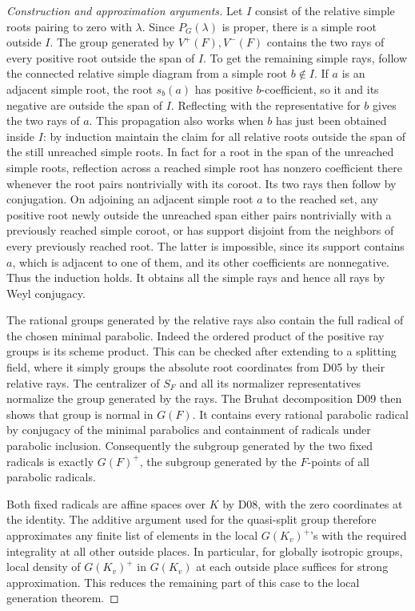 \documentclass[11pt,a4paper,openany,oneside]{book}
\theoremstyle{resultstyle}
\theoremstyle{definition}
\numberwithin{equation}{chapter}
\begin{document}
\begin{proof}[Construction and approximation arguments]
Let \(I\) consist of the relative simple roots pairing
to zero with \(\lambda\). Since \(P_G(\lambda)\) is
proper, there is a simple root outside \(I\).
The group generated by \(V^+(F),V^-(F)\) contains the
two rays of every positive root outside the span of
\(I\). To get the remaining simple rays, follow the
connected relative simple diagram from a simple root
\(b\notin I\). If \(a\) is an adjacent simple root, the
root \(s_b(a)\) has positive \(b\)-coefficient, so it and
its negative are outside the span of \(I\). Reflecting
with the representative for \(b\) gives the two rays of
\(a\). This propagation also works when \(b\) has just
been obtained inside \(I\): by induction maintain the
claim for all relative roots outside the span of the
still unreached simple roots. In fact for a root in the
span of the unreached simple roots, reflection across
a reached simple root has nonzero coefficient there
whenever the root pairs nontrivially with its coroot.
Its two rays then follow by conjugation. On adjoining
an adjacent simple root \(a\) to the reached set, any
positive root newly outside the unreached span either
pairs nontrivially with a previously reached simple
coroot, or has support disjoint from the neighbors of
every previously reached root. The latter is impossible,
since its support contains \(a\), which is adjacent to
one of them, and its other coefficients are
nonnegative. Thus the induction holds. It obtains
all the simple rays and hence all rays by Weyl conjugacy.

The rational groups generated by the relative rays
also contain the full radical of the chosen minimal
parabolic. Indeed the ordered product of the positive
ray groups is its scheme product. This can be checked
after extending to a splitting field, where it simply
groups the absolute root coordinates from D05 by their
relative rays. The centralizer of \(S_F\) and all its
normalizer representatives normalize the group generated
by the rays. The Bruhat decomposition D09 then shows
that group is normal in \(G(F)\). It contains every
rational parabolic radical by conjugacy of the minimal
parabolics and containment of radicals under parabolic
inclusion. Consequently the subgroup generated by the
two fixed radicals is exactly \(G(F)^+\), the subgroup
generated by the \(F\)-points of all parabolic radicals.

Both fixed radicals are affine spaces over \(K\) by
D08, with the zero coordinates at the identity.
The additive argument used for the quasi-split group
therefore approximates any finite list of elements in
the local \(G(K_v)^+\)'s with the required integrality at
all other outside places. In particular, for globally
isotropic groups, local density of \(G(K_v)^+\) in
\(G(K_v)\) at each outside place suffices for strong
approximation. This reduces the remaining part of this
case to the local generation theorem.


\end{proof}
\end{document}
